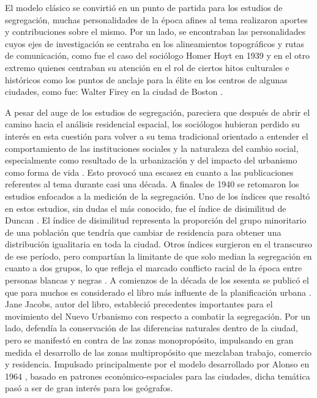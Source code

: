El modelo clásico se convirtió en un punto de partida para los estudios de segregación, muchas personalidades de la época afines al tema realizaron aportes y contribuciones sobre el mismo. Por un lado, se encontraban las personalidades cuyos ejes de investigación se centraba en los alineamientos topográficos y rutas de comunicación, como fue el caso del sociólogo Homer Hoyt en 1939 \cite{Adams2005HoytH1} y en el otro extremo quienes centraban su atención en el rol de ciertos hitos culturales e históricos como los puntos de anclaje para la élite en los centros de algunas ciudades, como fue: Walter Firey en la ciudad de Boston \cite{Gilmore1947LandUI}.	

A pesar del auge de los estudios de segregación, pareciera que después de abrir el camino hacia el análisis residencial espacial, los sociólogos hubieran perdido su interés en esta cuestión para volver a su tema tradicional orientado a entender el comportamiento de las instituciones sociales y la naturaleza del cambio    social, especialmente como resultado de la urbanización y del impacto del urbanismo como forma   de vida \cite{Manella2014LouisW}. Esto provocó una escasez en cuanto a las publicaciones referentes al tema durante casi una década.
A finales de 1940 se retomaron los estudios enfocados a la medición de la segregación. Uno de los índices que resaltó en estos estudios, sin dudas el más conocido, fue el índice de disimilitud de Duncan \cite{Duncan1955AMA}. El índice de disimilitud representa la proporción del grupo minoritario de una población que tendría que cambiar de residencia para obtener una distribución igualitaria en toda la ciudad. Otros índices surgieron en el transcurso de ese período, pero compartían la limitante de que solo median la segregación en cuanto a dos grupos, lo que refleja el marcado conflicto racial de la época entre personas blancas y negras \cite{Feitosa2004SpatialMO}.
A comienzos de la década de los sesenta se publicó el que para muchos es considerado el libro más influente de la planificación urbana \cite{Jacobs1961TheDA} \cite{NT}. Jane Jacobs, autor del libro, estableció precedentes importantes para el movimiento del Nuevo Urbanismo con respecto a combatir la segregación. Por un lado, defendía la conservación de las diferencias naturales dentro de la ciudad, pero se manifestó en contra de las zonas monopropósito, impulsando en gran medida el desarrollo de las zonas multipropósito que mezclaban trabajo, comercio y residencia. Impulsado principalmente por el modelo desarrollado por Alonso en 1964 \cite{Kirwan1966BookRL}, basado en patrones económico-espaciales para las ciudades, dicha temática pasó a ser de gran interés para los geógrafos. 

